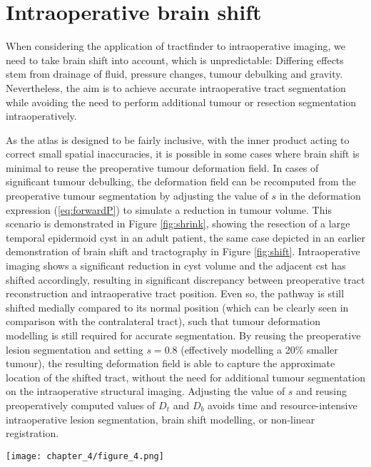 \section{Intraoperative brain shift}
\label{sec:imri}

When considering the application of tractfinder to intraoperative imaging, we need to take brain shift into account, which is unpredictable:
Differing effects stem from drainage of fluid, pressure changes, tumour debulking and gravity.
Nevertheless, the aim is to achieve accurate intraoperative tract segmentation while avoiding the need to perform additional tumour or resection segmentation intraoperatively.

As the atlas is designed to be fairly inclusive, with the inner product acting to correct small spatial inaccuracies, it is possible in some cases where brain shift is minimal to reuse the preoperative tumour deformation field.
In cases of significant tumour debulking, the deformation field can be recomputed from the preoperative tumour segmentation by adjusting the value of $s$ in the deformation expression (\ref{eq:forwardP}) to simulate a reduction in tumour volume.
This scenario is demonstrated in Figure \ref{fig:shrink}, showing the resection of a large temporal epidermoid cyst in an adult patient, the same case depicted in an earlier demonstration of brain shift and tractography in Figure \ref{fig:shift}.
Intraoperative imaging shows a significant reduction in cyst volume and the adjacent \gls{cst} has shifted accordingly, resulting in significant discrepancy between preoperative tract reconstruction and intraoperative tract position.
Even so, the pathway is still shifted medially compared to its normal position (which can be clearly seen in comparison with the contralateral tract), such that tumour deformation modelling is still required for accurate segmentation.
By reusing the preoperative lesion segmentation and setting $s=0.8$ (effectively modelling a 20\% smaller tumour), the resulting deformation field is able to capture the approximate location of the shifted tract, without the need for additional tumour segmentation on the intraoperative structural imaging.
Adjusting the value of $s$ and reusing preoperatively computed values of $D_t$ and $D_b$ avoids time and resource-intensive intraoperative lesion segmentation, brain shift modelling, or non-linear registration.

\begin{figure*}[h!]
  \centering
  \texttt{[image: chapter\_4/figure\_4.png]}
  \caption{Example results in intraoperative image using scaled preoperative tumour segmentation. Blue outline: Tumour segmentation. Green outline: effective tumour boundary with $s=0.8$ used for intraoperative segmentation}
  \label{fig:shrink}
\end{figure*}

